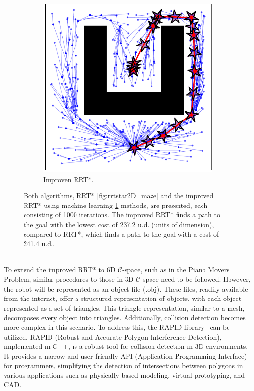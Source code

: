\documentclass{ctuthesis}
\begin{document}
\begin{figure}[!ht]
\begin{subfigure}[b]{0.45\textwidth}
      \includegraphics[width=\textwidth]{figChap4/RRTstar2DML_maze237.2.pdf}
      \caption{Improven RRT*.}
      \label{fig:rrtstarML2D_maze}
  \end{subfigure}
  \caption{Both algorithms, 
  RRT* \ref{fig:rrtstar2D_maze} and the improved RRT* using 
  machine learning \ref{fig:rrtstarML2D_maze} methods, 
  are presented, each consisting of 1000 iterations. 
  The improved RRT* finds a path to the goal with 
  the lowest cost of 237.2 u.d. (units of dimension), compared to RRT*, 
  which finds a path to the goal with a cost of 241.4 u.d..}
  \label{fig:RRTstar2D_vs_RRTstarML2D}
\end{figure}
\\[12pt]
To extend the improved RRT* to 6D $\mathcal{C}$-space, 
such as in the Piano Movers Problem, similar procedures to those in 3D $\mathcal{C}$-space 
need to be followed. 
However, the robot will be represented as an object file (.obj). 
These files, readily available from the internet, 
offer a structured representation of objects, 
with each object represented as a set of triangles. 
This triangle representation, similar to a mesh, 
decomposes every object into triangles. 
Additionally, collision detection becomes more complex in this scenario. 
To address this, the RAPID library~\cite{gottschalk1997rapid} can be utilized. 
RAPID (Robust and Accurate Polygon Interference Detection), implemented in C++, 
is a robust tool for collision detection in 3D environments. 
It provides a narrow and user-friendly API (Application Programming Interface) for programmers, 
simplifying the detection of intersections between polygons in various applications such as 
physically based modeling, virtual prototyping, and CAD.  
\end{document}
